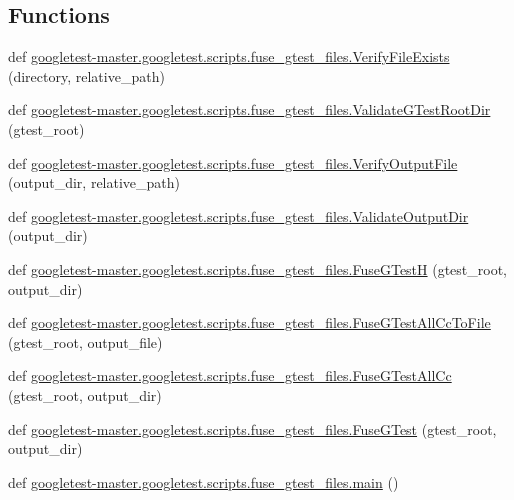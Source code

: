 \subsection*{Functions}
\begin{DoxyCompactItemize}
\item 
def \mbox{\hyperlink{namespacegoogletest-master_1_1googletest_1_1scripts_1_1fuse__gtest__files_a0a9d8acbd6fdde4621dcb6d0b340486b}{googletest-\/master.\+googletest.\+scripts.\+fuse\+\_\+gtest\+\_\+files.\+Verify\+File\+Exists}} (directory, relative\+\_\+path)
\item 
def \mbox{\hyperlink{namespacegoogletest-master_1_1googletest_1_1scripts_1_1fuse__gtest__files_a87c078da2aae6d0034023d9d6a31b5de}{googletest-\/master.\+googletest.\+scripts.\+fuse\+\_\+gtest\+\_\+files.\+Validate\+G\+Test\+Root\+Dir}} (gtest\+\_\+root)
\item 
def \mbox{\hyperlink{namespacegoogletest-master_1_1googletest_1_1scripts_1_1fuse__gtest__files_a35043ca8878d7330756b286eb81fe8a9}{googletest-\/master.\+googletest.\+scripts.\+fuse\+\_\+gtest\+\_\+files.\+Verify\+Output\+File}} (output\+\_\+dir, relative\+\_\+path)
\item 
def \mbox{\hyperlink{namespacegoogletest-master_1_1googletest_1_1scripts_1_1fuse__gtest__files_a9cb270487f77b24eae98e4d1eb4907c4}{googletest-\/master.\+googletest.\+scripts.\+fuse\+\_\+gtest\+\_\+files.\+Validate\+Output\+Dir}} (output\+\_\+dir)
\item 
def \mbox{\hyperlink{namespacegoogletest-master_1_1googletest_1_1scripts_1_1fuse__gtest__files_af242da18f3591868f23a75ef3fc0282c}{googletest-\/master.\+googletest.\+scripts.\+fuse\+\_\+gtest\+\_\+files.\+Fuse\+G\+TestH}} (gtest\+\_\+root, output\+\_\+dir)
\item 
def \mbox{\hyperlink{namespacegoogletest-master_1_1googletest_1_1scripts_1_1fuse__gtest__files_ab7129c36cbfcee2dedb66ded75e1029a}{googletest-\/master.\+googletest.\+scripts.\+fuse\+\_\+gtest\+\_\+files.\+Fuse\+G\+Test\+All\+Cc\+To\+File}} (gtest\+\_\+root, output\+\_\+file)
\item 
def \mbox{\hyperlink{namespacegoogletest-master_1_1googletest_1_1scripts_1_1fuse__gtest__files_ae7a4a904c470670bed357a5c41c6436b}{googletest-\/master.\+googletest.\+scripts.\+fuse\+\_\+gtest\+\_\+files.\+Fuse\+G\+Test\+All\+Cc}} (gtest\+\_\+root, output\+\_\+dir)
\item 
def \mbox{\hyperlink{namespacegoogletest-master_1_1googletest_1_1scripts_1_1fuse__gtest__files_afb5c44aaaf8f2eacd1d240368d9ef1f0}{googletest-\/master.\+googletest.\+scripts.\+fuse\+\_\+gtest\+\_\+files.\+Fuse\+G\+Test}} (gtest\+\_\+root, output\+\_\+dir)
\item 
def \mbox{\hyperlink{namespacegoogletest-master_1_1googletest_1_1scripts_1_1fuse__gtest__files_aede50cff168fdba596bdbc2988952a7e}{googletest-\/master.\+googletest.\+scripts.\+fuse\+\_\+gtest\+\_\+files.\+main}} ()
\end{DoxyCompactItemize}
